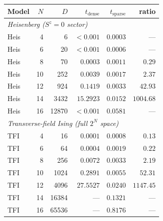 \begin{tabular}{lrrrrr}
\toprule
Model & $N$ & $D$ & $t_{\text{dense}}$ & $t_{\text{sparse}}$ & ratio \\
\midrule
\multicolumn{6}{l}{\textit{Heisenberg ($S^z = 0$ sector)}} \\
Heis & 4 & 6 & $<0.001$ & $0.0003$ & --- \\
Heis & 6 & 20 & $<0.001$ & $0.0006$ & --- \\
Heis & 8 & 70 & $0.0003$ & $0.0011$ & $0.29$ \\
Heis & 10 & 252 & $0.0039$ & $0.0017$ & $2.37$ \\
Heis & 12 & 924 & $0.1419$ & $0.0033$ & $42.93$ \\
Heis & 14 & 3432 & $15.2923$ & $0.0152$ & $1004.68$ \\
Heis & 16 & 12870 & $<0.001$ & $0.0581$ & --- \\
\multicolumn{6}{l}{\textit{Transverse-field Ising (full $2^N$ space)}} \\
TFI & 4 & 16 & $0.0001$ & $0.0008$ & $0.13$ \\
TFI & 6 & 64 & $0.0004$ & $0.0019$ & $0.22$ \\
TFI & 8 & 256 & $0.0072$ & $0.0033$ & $2.19$ \\
TFI & 10 & 1024 & $0.2891$ & $0.0055$ & $52.31$ \\
TFI & 12 & 4096 & $27.5527$ & $0.0240$ & $1147.45$ \\
TFI & 14 & 16384 & --- & $0.1321$ & --- \\
TFI & 16 & 65536 & --- & $0.8176$ & --- \\
\bottomrule
\end{tabular}
